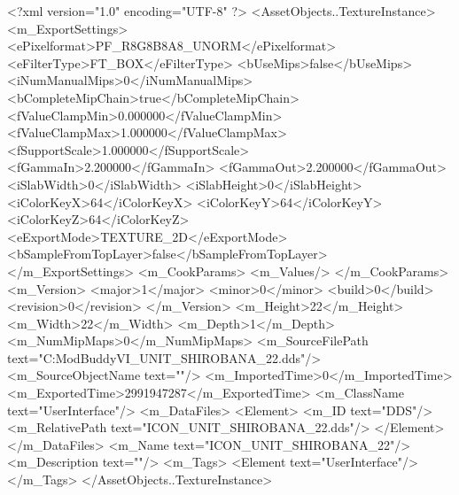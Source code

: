 <?xml version="1.0" encoding="UTF-8" ?>
<AssetObjects..TextureInstance>
	<m_ExportSettings>
		<ePixelformat>PF_R8G8B8A8_UNORM</ePixelformat>
		<eFilterType>FT_BOX</eFilterType>
		<bUseMips>false</bUseMips>
		<iNumManualMips>0</iNumManualMips>
		<bCompleteMipChain>true</bCompleteMipChain>
		<fValueClampMin>0.000000</fValueClampMin>
		<fValueClampMax>1.000000</fValueClampMax>
		<fSupportScale>1.000000</fSupportScale>
		<fGammaIn>2.200000</fGammaIn>
		<fGammaOut>2.200000</fGammaOut>
		<iSlabWidth>0</iSlabWidth>
		<iSlabHeight>0</iSlabHeight>
		<iColorKeyX>64</iColorKeyX>
		<iColorKeyY>64</iColorKeyY>
		<iColorKeyZ>64</iColorKeyZ>
		<eExportMode>TEXTURE_2D</eExportMode>
		<bSampleFromTopLayer>false</bSampleFromTopLayer>
	</m_ExportSettings>
	<m_CookParams>
		<m_Values/>
	</m_CookParams>
	<m_Version>
		<major>1</major>
		<minor>0</minor>
		<build>0</build>
		<revision>0</revision>
	</m_Version>
	<m_Height>22</m_Height>
	<m_Width>22</m_Width>
	<m_Depth>1</m_Depth>
	<m_NumMipMaps>0</m_NumMipMaps>
	<m_SourceFilePath text="C:\Users\asus\Documents\Firaxis ModBuddy\Civilization VI\temppic\ICON_UNIT_SHIROBANA_22.dds"/>
	<m_SourceObjectName text=""/>
	<m_ImportedTime>0</m_ImportedTime>
	<m_ExportedTime>2991947287</m_ExportedTime>
	<m_ClassName text="UserInterface"/>
	<m_DataFiles>
		<Element>
			<m_ID text="DDS"/>
			<m_RelativePath text="ICON_UNIT_SHIROBANA_22.dds"/>
		</Element>
	</m_DataFiles>
	<m_Name text="ICON_UNIT_SHIROBANA_22"/>
	<m_Description text=""/>
	<m_Tags>
		<Element text="UserInterface"/>
	</m_Tags>
</AssetObjects..TextureInstance>

